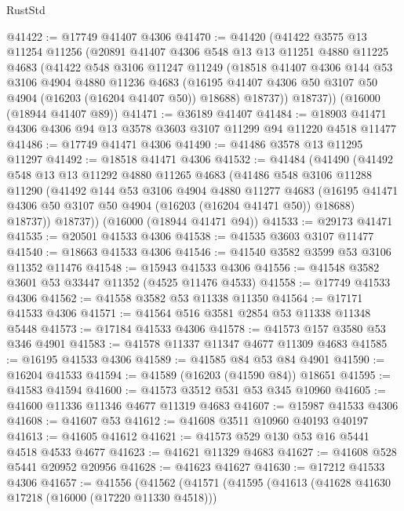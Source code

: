 \begin{lexlean}{RustStd}
\begin{coremodule}
@41422 := @17749 @41407 @4306
@41470 := @41420
    (@41422
      @3575
      @13
      @11254
      @11256
      (@20891
        @41407
        @4306
        @548
        @13
        @13
        @11251
        @4880
        @11225
        @4683
        (@41422
          @548
          @3106
          @11247
          @11249
          (@18518
            @41407
            @4306
            @144
            @53
            @3106
            @4904
            @4880
            @11236
            @4683
            (@16195 @41407 @4306 @50 @3107 @50 @4904 (@16203 (@16204 @41407 @50)) @18688)
            @18737))
        @18737))
    (@16000 (@18944 @41407 @89))
@41471 := @36189 @41407
@41484 := @18903 @41471 @4306 @4306 @94 @13 @3578 @3603 @3107 @11299 @94 @11220 @4518 @11477
@41486 := @17749 @41471 @4306
@41490 := @41486 @3578 @13 @11295 @11297
@41492 := @18518 @41471 @4306
@41532 := @41484
    (@41490
      (@41492
        @548
        @13
        @13
        @11292
        @4880
        @11265
        @4683
        (@41486
          @548
          @3106
          @11288
          @11290
          (@41492
            @144
            @53
            @3106
            @4904
            @4880
            @11277
            @4683
            (@16195 @41471 @4306 @50 @3107 @50 @4904 (@16203 (@16204 @41471 @50)) @18688)
            @18737))
        @18737))
    (@16000 (@18944 @41471 @94))
@41533 := @29173 @41471
@41535 := @20501 @41533 @4306
@41538 := @41535 @3603 @3107 @11477
@41540 := @18663 @41533 @4306
@41546 := @41540 @3582 @3599 @53 @3106 @11352 @11476
@41548 := @15943 @41533 @4306
@41556 := @41548 @3582 @3601 @53 @33447 @11352 (@4525 @11476 @4533)
@41558 := @17749 @41533 @4306
@41562 := @41558 @3582 @53 @11338 @11350
@41564 := @17171 @41533 @4306
@41571 := @41564 @516 @3581 @2854 @53 @11338 @11348 @5448
@41573 := @17184 @41533 @4306
@41578 := @41573 @157 @3580 @53 @346 @4901
@41583 := @41578 @11337 @11347 @4677 @11309 @4683
@41585 := @16195 @41533 @4306
@41589 := @41585 @84 @53 @84 @4901
@41590 := @16204 @41533
@41594 := @41589 (@16203 (@41590 @84)) @18651
@41595 := @41583 @41594
@41600 := @41573 @3512 @531 @53 @345 @10960
@41605 := @41600 @11336 @11346 @4677 @11319 @4683
@41607 := @15987 @41533 @4306
@41608 := @41607 @53
@41612 := @41608 @3511 @10960 @40193 @40197
@41613 := @41605 @41612
@41621 := @41573 @529 @130 @53 @16 @5441 @4518 @4533 @4677
@41623 := @41621 @11329 @4683
@41627 := @41608 @528 @5441 @20952 @20956
@41628 := @41623 @41627
@41630 := @17212 @41533 @4306
@41657 := @41556
    (@41562
      (@41571
        (@41595
          (@41613
            (@41628 @41630 @17218 (@16000 (@17220 @11330 @4518)))

\end{coremodule}
\end{lexlean}
